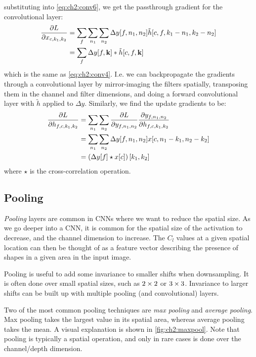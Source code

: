 substituting into \eqref{eq:ch2:conv6}, we get the passthrough gradient for the
convolutional layer:
\begin{align}
  \frac{\partial L}{\partial x_{c,k_1,k_2}} &= \sum_f \sum_{n_1} \sum_{n_2} \Delta y[f, n_1, n_2] \tilde{h}[c, f, k_1-n_1, k_2-n_2 ] \\
                          &= \sum_f \Delta y[f, \mathbf{k}] \ast \tilde{h}[c, f, \mathbf{k}] \label{eq:ch2:cnn_passthrough}
\end{align}
which is the same as \eqref{eq:ch2:conv4}. I.e. we can backpropagate the
gradients through a convolutional layer by mirror-imaging the filters spatially,
transposing them in the channel and filter dimensions, and doing a forward
convolutional layer with $\tilde{h}$ applied to $\Delta y$. Similarly, we
find the update gradients to be:
\begin{align}
  \frac{\partial L}{\partial h_{f,c,k_1,k_2}} &= \sum_{n_1} \sum_{n_2} \frac{\partial L}{\partial y_{f, n_1, n_2}} \frac{\partial y_{f, n_1, n_2}}{\partial h_{f, c, k_1, k_2}}  \\
                            &= \sum_{n_1} \sum_{n_2} \Delta y[f, n_1, n_2] x[c, n_1-k_1, n_2-k_2 ] \\
                            &= \left(\Delta y[f] \star x[c]\right)[k_1, k_2] \label{eq:ch2:cnn_weight_update}
\end{align}
where $\star$ is the cross-correlation operation.

\subsection{Pooling}
\emph{Pooling} layers are common in CNNs where we want to reduce the spatial size. As
we go deeper into a CNN, it is common for the spatial size of the activation to
decrease, and the channel dimension to increase. The $C_l$ values at a given
spatial location can then be thought of as a feature vector describing the
presence of shapes in a given area in the input image.

Pooling is useful to add some invariance to smaller shifts when downsampling. It
is often done over small spatial sizes, such as $2\times 2$ or $3\times 3$. Invariance
to larger shifts can be built up with multiple pooling (and convolutional) layers.

Two of the most common pooling techniques are \emph{max pooling} and
\emph{average pooling}. Max pooling takes the largest value in its spatial area,
whereas average pooling takes the mean. A visual explanation is shown in
\autoref{fig:ch2:maxpool}. Note that pooling is typically a spatial operation,
and only in rare cases is done over the channel/depth dimension.

